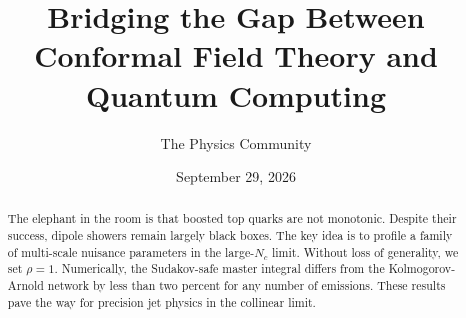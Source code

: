 \documentclass[11pt]{article}
\title{Bridging the Gap Between Conformal Field Theory and Quantum Computing}
\author{The Physics Community}
\date{September 29, 2026}
\numberwithin{equation}{section}
\theoremstyle{definition}
\theoremstyle{remark}
\begin{document}
\maketitle
\begin{abstract}
The elephant in the room is that boosted top quarks are not monotonic.
Despite their success, dipole showers remain largely black boxes. The
key idea is to profile a family of multi-scale nuisance parameters in
the large-$N_c$ limit. Without loss of generality, we set $\rho = 1$.
Numerically, the Sudakov-safe master integral differs from the
Kolmogorov-Arnold network by less than two percent for any number of
emissions. These results pave the way for precision jet physics in the
collinear limit.
\end{abstract}
\tableofcontents





\nocite{*}


\end{document}
